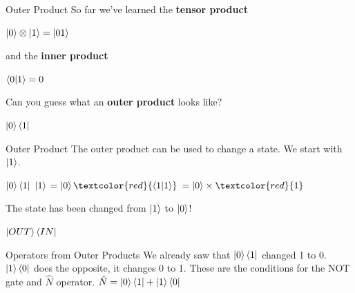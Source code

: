 \documentclass{beamer}
\begin{document}
\begin{frame}{Outer Product}
    So far we've learned the \textbf{tensor product}\vfill
    \begin{center}
        \begin{math}
            \ket{0} \otimes \ket{1} = \ket{01}
        \end{math}
    \end{center}\vfill
    \pause
    and the \textbf{inner product}\vfill
    \begin{center}
    \begin{math}
        \braket{0}{1} = 0
    \end{math}\vfill
    \end{center}
    \pause
    Can you guess what an \textbf{outer product} looks like?
    \vfill
    \pause
    \begin{center}
        \begin{math}
            \ket{0}\bra{1}
        \end{math}        
    \end{center}
\end{frame}

\begin{frame}{Outer Product}
    The outer product can be used to change a state. We start with $\ket{1}$.\vfill
    \begin{center}
        \begin{math}
            \ket{0}\bra{1} \ \ket{1}
        \end{math}\vfill
        \pause
        \begin{math}
            =\ket{0}\textcolor{red}{\bra{1}\ket{1}}
        \end{math}\vfill
        \pause
        \begin{math}
            =\ket{0}\times\textcolor{red}{1}
        \end{math}\vfill
    \end{center}
    \pause
    The state has been changed from $\ket{1}$ to $\ket{0}$!\vfill
    \begin{center}
        \begin{math}
            \ket{OUT}\bra{IN}
        \end{math}
    \end{center}
\end{frame}

\begin{frame}{Operators from Outer Products}
    We already saw that $\ket{0}\bra{1}$ changed 1 to 0.\vfill
    $\ket{1}\bra{0}$ does the opposite, it changes 0 to 1.\vfill
    \pause
    These are the conditions for the NOT gate and $\hat{N}$ operator.\vfill
    \centering
        \begin{math}
            \hat{N} = \ket{0}\bra{1} + \ket{1}\bra{0}
        \end{math}
\end{frame}
\end{document}
